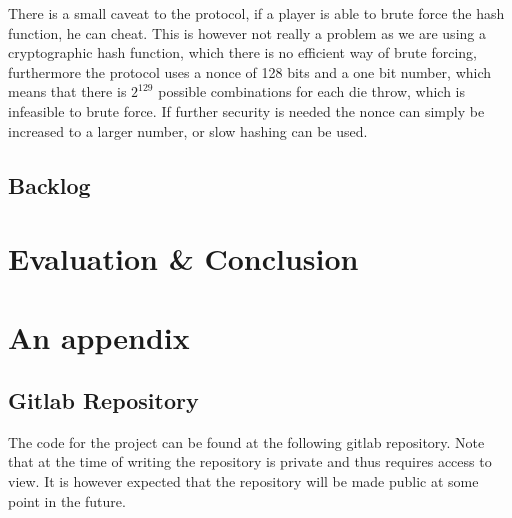 \documentclass[ twoside,openright,titlepage,numbers=noenddot,headinclude,%
                footinclude=true,cleardoublepage=empty,abstractoff, %
                BCOR=5mm,paper=a4,fontsize=11pt,%
                ngerman,american,%
                ]{scrreprt}
\begin{document}
There is a small caveat to the protocol, if a player is able to brute force the hash function, he can cheat. This is however not really a problem as we are using a cryptographic hash function, which there is no efficient way of brute forcing, furthermore the protocol uses a nonce of 128 bits and a one bit number, which means that there is $2^{129}$ possible combinations for each die throw, which is infeasible to brute force. If further security is needed the nonce can simply be increased to a larger number, or slow hashing can be used.

\section{Backlog}



\chapter{Evaluation \& Conclusion}
\label{cha:evaluation}





\appendix
\cleardoublepage

\chapter{An appendix}
\label{cha:an-appendix}

\section{Gitlab Repository}
The code for the project can be found at the following gitlab repository. Note that at the time of writing the repository is private and thus requires access to view. It is however expected that the repository will be made public at some point in the future.\\




\cleardoublepage

\end{document}
